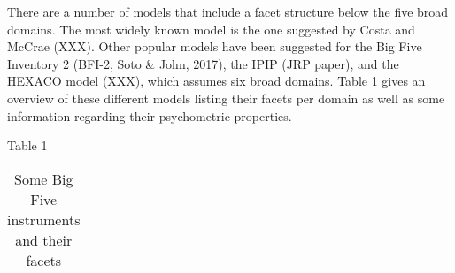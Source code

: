 \documentclass[man]{apa6}
\theoremstyle{definition}
\theoremstyle{definition}
\theoremstyle{definition}
\theoremstyle{remark}
\begin{document}
There are a number of models that include a facet structure below the
five broad domains. The most widely known model is the one suggested by
Costa and McCrae (XXX). Other popular models have been suggested for the
Big Five Inventory 2 (BFI-2, Soto \& John, 2017), the IPIP (JRP paper),
and the HEXACO model (XXX), which assumes six broad domains. Table 1
gives an overview of these different models listing their facets per
domain as well as some information regarding their psychometric
properties.

Table 1

\setlength\extrarowheight{-2pt}

\begin{table}[ht]
   \renewcommand\thetable{1.1}

\caption{Some Big Five instruments and their facets}
\label{my-label}
\begin{tabular}{llllll}


\end{tabular}
\end{table}
\end{document}
